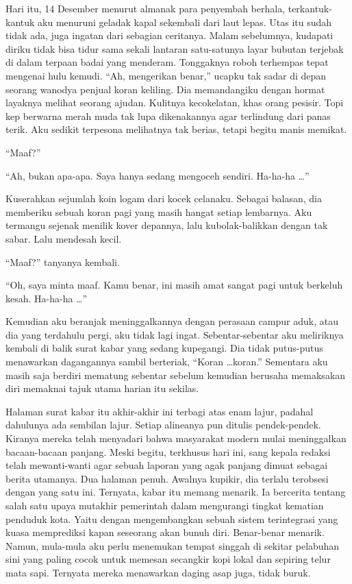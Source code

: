 \documentclass[smalldemyvopaper,11pt,twoside,onecolumn,openright,extrafontsizes]{memoir}
\begin{document}

Hari itu, 14 Desember menurut almanak para penyembah berhala, terkantuk-kantuk aku menuruni geladak kapal sekembali dari laut lepas. Utas itu sudah tidak ada, juga ingatan dari sebagian ceritanya. Malam sebelumnya, kudapati diriku tidak bisa tidur sama sekali lantaran satu-satunya layar bubutan terjebak di dalam terpaan badai yang menderam. Tonggaknya roboh terhempas tepat mengenai hulu kemudi. ``Ah, mengerikan benar,'' ucapku tak sadar di depan seorang wanodya penjual koran keliling. Dia memandangiku dengan hormat layaknya melihat seorang ajudan. Kulitnya kecokelatan, khas orang pesisir. Topi kep berwarna merah muda tak lupa dikenakannya agar terlindung dari panas terik. Aku sedikit terpesona melihatnya tak berias, tetapi begitu manis memikat.

``Maaf?''

``Ah, bukan apa-apa. Saya hanya sedang mengoceh sendiri. Ha-ha-ha \dots''

Kuserahkan sejumlah koin logam dari kocek celanaku. Sebagai balasan, dia memberiku sebuah koran pagi yang masih hangat setiap lembarnya. Aku termangu sejenak menilik kover depannya, lalu kubolak-balikkan dengan tak sabar. Lalu mendesah kecil.

``Maaf?'' tanyanya kembali.


``Oh, saya minta maaf. Kamu benar, ini masih amat sangat pagi untuk berkeluh kesah. Ha-ha-ha \dots''


Kemudian aku beranjak meninggalkannya dengan perasaan campur aduk, atau dia yang terdahulu pergi, aku tidak lagi ingat. Sebentar-sebentar aku meliriknya kembali di balik surat kabar yang sedang kupegangi. Dia tidak putus-putus menawarkan dagangannya sambil berteriak, ``Koran \dots koran.'' Sementara aku masih saja berdiri mematung sebentar sebelum kemudian berusaha memaksakan diri memaknai tajuk utama harian itu sekilas.


Halaman surat kabar itu akhir-akhir ini terbagi atas enam lajur, padahal dahulunya ada sembilan lajur. Setiap alineanya pun ditulis pendek-pendek. Kiranya mereka telah menyadari bahwa masyarakat modern mulai meninggalkan bacaan-bacaan panjang. Meski begitu, terkhusus hari ini, sang kepala redaksi telah mewanti-wanti agar sebuah laporan yang agak panjang dimuat sebagai berita utamanya. Dua halaman penuh. Awalnya kupikir, dia terlalu terobsesi dengan yang satu ini. Ternyata, kabar itu memang menarik. Ia bercerita tentang salah satu upaya mutakhir pemerintah dalam mengurangi tingkat kematian penduduk kota. Yaitu dengan mengembangkan sebuah sistem terintegrasi yang kuasa memprediksi kapan seseorang akan bunuh diri. Benar-benar menarik. Namun, mula-mula aku perlu menemukan tempat singgah di sekitar pelabuhan sini yang paling cocok untuk memesan secangkir kopi lokal dan sepiring telur mata sapi. Ternyata mereka menawarkan daging asap juga, tidak buruk.
\end{document}

